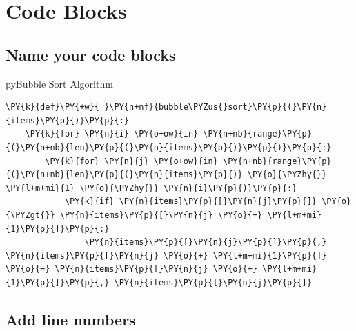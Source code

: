 \section{Code Blocks}\label{code-blocks}

\subsection{Name your code blocks}\label{name-your-code-blocks}

\begin{code}{py}{Bubble Sort Algorithm}{}
\begin{Verbatim}[commandchars=\\\{\},breaklines, breakanywhere, commandchars=\\\{\}]
\PY{k}{def}\PY{+w}{ }\PY{n+nf}{bubble\PYZus{}sort}\PY{p}{(}\PY{n}{items}\PY{p}{)}\PY{p}{:}
    \PY{k}{for} \PY{n}{i} \PY{o+ow}{in} \PY{n+nb}{range}\PY{p}{(}\PY{n+nb}{len}\PY{p}{(}\PY{n}{items}\PY{p}{)}\PY{p}{)}\PY{p}{:}
        \PY{k}{for} \PY{n}{j} \PY{o+ow}{in} \PY{n+nb}{range}\PY{p}{(}\PY{n+nb}{len}\PY{p}{(}\PY{n}{items}\PY{p}{)} \PY{o}{\PYZhy{}} \PY{l+m+mi}{1} \PY{o}{\PYZhy{}} \PY{n}{i}\PY{p}{)}\PY{p}{:}
            \PY{k}{if} \PY{n}{items}\PY{p}{[}\PY{n}{j}\PY{p}{]} \PY{o}{\PYZgt{}} \PY{n}{items}\PY{p}{[}\PY{n}{j} \PY{o}{+} \PY{l+m+mi}{1}\PY{p}{]}\PY{p}{:}
                \PY{n}{items}\PY{p}{[}\PY{n}{j}\PY{p}{]}\PY{p}{,} \PY{n}{items}\PY{p}{[}\PY{n}{j} \PY{o}{+} \PY{l+m+mi}{1}\PY{p}{]} \PY{o}{=} \PY{n}{items}\PY{p}{[}\PY{n}{j} \PY{o}{+} \PY{l+m+mi}{1}\PY{p}{]}\PY{p}{,} \PY{n}{items}\PY{p}{[}\PY{n}{j}\PY{p}{]}
\end{Verbatim}
\end{code}
\subsection{Add line numbers}\label{add-line-numbers}

